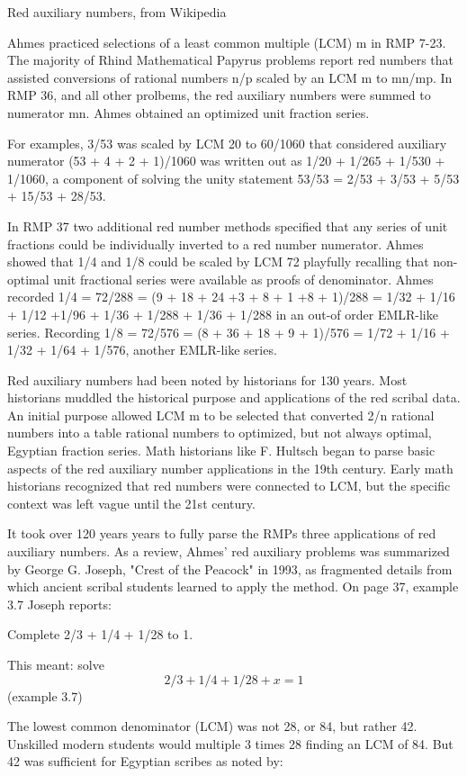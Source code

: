 \documentclass[12pt]{article}
\begin{document}
Red auxiliary numbers, from Wikipedia

Ahmes practiced selections of a least common multiple (LCM) m in RMP 7-23. The majority of Rhind Mathematical Papyrus problems report red numbers that assisted conversions of  rational numbers n/p scaled by an LCM m to mn/mp. In RMP 36, and all other prolbems, the red auxiliary numbers were summed to numerator mn. Ahmes obtained an optimized unit fraction series. 

For examples, 3/53 was scaled by LCM 20 to 60/1060 that considered auxiliary numerator (53 + 4 + 2 + 1)/1060 was written out as 1/20 + 1/265 + 1/530 + 1/1060,  a component of solving the unity statement 53/53 = 2/53 + 3/53 + 5/53 + 15/53 + 28/53.
 
In RMP 37 two additional red number methods specified that any series of unit fractions could be individually inverted to a red number numerator. Ahmes showed that 1/4 and 1/8 could be scaled by LCM 72 playfully recalling that non-optimal unit fractional series were available as proofs of denominator. Ahmes recorded 1/4 = 72/288 = (9 + 18 + 24 +3 + 8 + 1 +8 + 1)/288 = 1/32 + 1/16 + 1/12 +1/96 + 1/36 + 1/288 + 1/36 + 1/288 in an out-of order EMLR-like series. Recording 1/8 = 72/576 = (8 + 36 + 18 + 9 + 1)/576 = 1/72 + 1/16 + 1/32 + 1/64 + 1/576, another EMLR-like series.

Red auxiliary numbers had been noted by historians for 130 years. Most historians muddled the historical purpose and applications of the red scribal data. An initial purpose allowed LCM m to be selected that converted 2/n rational numbers into a table rational numbers to optimized, but not always optimal, Egyptian fraction series. Math historians like F. Hultsch began to parse basic aspects of the red auxiliary number applications in the 19th century. Early math historians recognized that red numbers were connected to LCM, but the specific context was left vague until the 21st century.

It took over 120 years years to fully parse the RMPs three applications of red auxiliary numbers. As a review, Ahmes' red auxiliary problems was summarized by George G. Joseph, "Crest of the Peacock" in 1993, as fragmented details from which ancient scribal students learned to apply the method. On page 37, example 3.7 Joseph reports:

Complete 2/3 + 1/4 + 1/28 to 1.

This meant: solve $$2/3 + 1/4 + 1/28 + x = 1$$ (example 3.7)

The lowest common denominator (LCM) was not 28, or 84, but rather 42. Unskilled modern students would multiple 3 times 28 finding an LCM of 84. But 42 was sufficient for Egyptian scribes as noted by:
\end{document}
